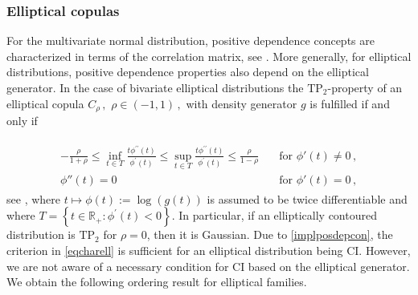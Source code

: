 \documentclass{article}
\newcommand{\R}{\mathbb{R}}
\newcommand{\TP}{\mathrm{TP_2}}
\begin{document}
\subsubsection{Elliptical copulas}\label{secpropellcop}

For the multivariate normal distribution, positive dependence concepts are characterized in terms of the correlation matrix, see \cite{Rueschendorf-1981b}.
More generally, for elliptical distributions, positive dependence properties also depend on the elliptical generator.
In the case of bivariate elliptical distributions the \(\TP\)-property of an elliptical copula \(C_\rho\,,\) \(\rho\in (-1,1)\,,\) with density generator $g$ is fulfilled if and only if

\begin{align}
    \begin{aligned}\label{eqcharell}
    -\frac{\rho}{1+\rho} \leq \inf _{t \in T} \frac{t \phi^{\prime \prime}(t)}{\phi^{\prime}(t)} \leq \sup _{t \in T} \frac{t \phi^{\prime \prime}(t)}{\phi^{\prime}(t)} \leq \frac{\rho}{1-\rho} \quad &\text{for } \phi'(t) \neq 0\,,\\
    \phi''(t)=0 \quad &\text{for } \phi'(t)=0\,,
    \end{aligned}
\end{align}
see \cite[Proposition 1.2]{Abdous-2005},
where $t\mapsto \phi(t):=\log(g(t))$ is assumed to be twice differentiable and where $T=\left\{t \in \R_+: \phi^{\prime}(t)<0\right\}$.
In particular, if an elliptically contoured distribution is \(\TP\) for $\rho=0$, then it is Gaussian.
Due to \eqref{implposdepcon}, the criterion in \eqref{eqcharell} is sufficient for an elliptical distribution being CI.
However, we are not aware of a necessary condition for CI based on the elliptical generator.
We obtain the following ordering result for elliptical families.
\end{document}
